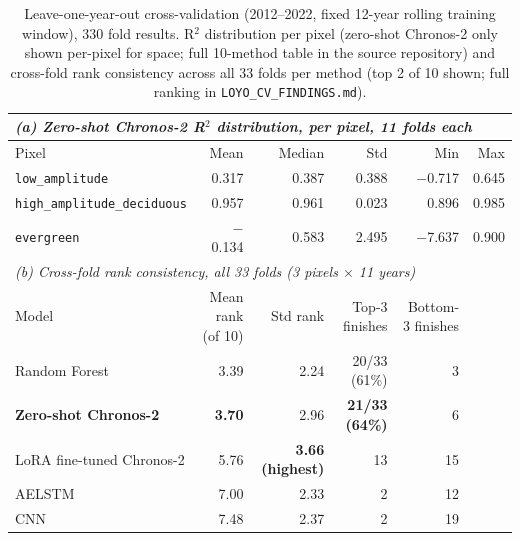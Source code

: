 \begin{table}[t]
\centering
\caption{Leave-one-year-out cross-validation (2012--2022, fixed 12-year rolling training window),
330 fold results. R$^2$ distribution per pixel (zero-shot Chronos-2 only shown per-pixel for
space; full 10-method table in the source repository) and cross-fold rank consistency across all
33 folds per method (top 2 of 10 shown; full ranking in \texttt{LOYO\_CV\_FINDINGS.md}).}
\label{tab:loyo}
\begin{tabular}{lrrrrr}
\toprule
\multicolumn{6}{l}{\textit{(a) Zero-shot Chronos-2 R$^2$ distribution, per pixel, 11 folds each}} \\
\midrule
Pixel & Mean & Median & Std & Min & Max \\
\midrule
\texttt{low\_amplitude} & 0.317 & 0.387 & 0.388 & $-$0.717 & 0.645 \\
\texttt{high\_amplitude\_deciduous} & 0.957 & 0.961 & 0.023 & 0.896 & 0.985 \\
\texttt{evergreen} & $-$0.134 & 0.583 & 2.495 & $-$7.637 & 0.900 \\
\midrule
\multicolumn{6}{l}{\textit{(b) Cross-fold rank consistency, all 33 folds (3 pixels $\times$ 11 years)}} \\
\midrule
Model & Mean rank (of 10) & Std rank & Top-3 finishes & Bottom-3 finishes & \\
\midrule
Random Forest & 3.39 & 2.24 & 20/33 (61\%) & 3 & \\
\textbf{Zero-shot Chronos-2} & \textbf{3.70} & 2.96 & \textbf{21/33 (64\%)} & 6 & \\
LoRA fine-tuned Chronos-2 & 5.76 & \textbf{3.66 (highest)} & 13 & 15 & \\
AELSTM & 7.00 & 2.33 & 2 & 12 & \\
CNN & 7.48 & 2.37 & 2 & 19 & \\
\bottomrule
\end{tabular}
\end{table}

